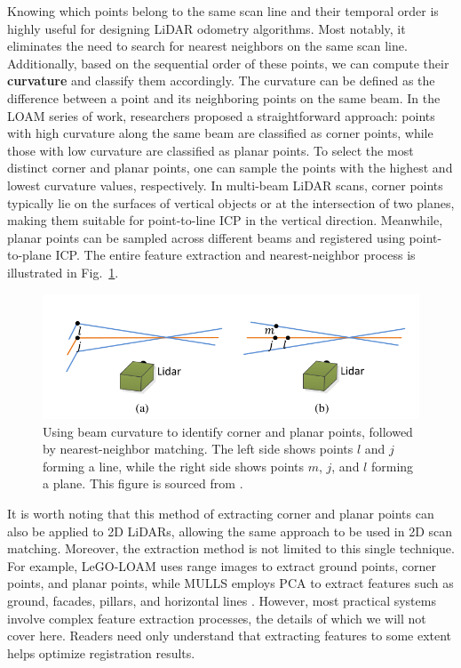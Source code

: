 Knowing which points belong to the same scan line and their temporal order is highly useful for designing LiDAR odometry algorithms. Most notably, it eliminates the need to search for nearest neighbors on the same scan line. Additionally, based on the sequential order of these points, we can compute their \textbf{curvature} and classify them accordingly. The curvature can be defined as the difference between a point and its neighboring points on the same beam. In the LOAM series of work, researchers proposed a straightforward approach: points with high curvature along the same beam are classified as corner points, while those with low curvature are classified as planar points. To select the most distinct corner and planar points, one can sample the points with the highest and lowest curvature values, respectively. In multi-beam LiDAR scans, corner points typically lie on the surfaces of vertical objects or at the intersection of two planes, making them suitable for point-to-line ICP in the vertical direction. Meanwhile, planar points can be sampled across different beams and registered using point-to-plane ICP. The entire feature extraction and nearest-neighbor process is illustrated in Fig.~\ref{fig:curvature}.  

\begin{figure}[!thp]  
	\centering  
	\includegraphics[width=.8\textwidth]{resources/3d-lidar-mapping/curvature.png}  
	\caption{Using beam curvature to identify corner and planar points, followed by nearest-neighbor matching. The left side shows points $l$ and $j$ forming a line, while the right side shows points $m$, $j$, and $l$ forming a plane. This figure is sourced from \cite{Zhang2014}.}  
	\label{fig:curvature}  
\end{figure}  

It is worth noting that this method of extracting corner and planar points can also be applied to 2D LiDARs, allowing the same approach to be used in 2D scan matching. Moreover, the extraction method is not limited to this single technique. For example, LeGO-LOAM \cite{Shan2018} uses range images to extract ground points, corner points, and planar points, while MULLS employs PCA to extract features such as ground, facades, pillars, and horizontal lines \cite{Pan2021}. However, most practical systems involve complex feature extraction processes, the details of which we will not cover here. Readers need only understand that extracting features to some extent helps optimize registration results.  

